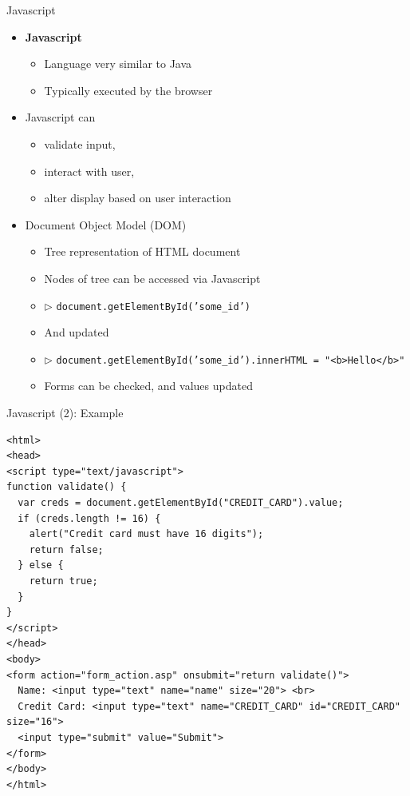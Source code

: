 \documentclass[aspectratio=169, xcolor=dvipsnames]{beamer}
\begin{document}
\begin{frame}{Javascript}
    \begin{itemize}
        \item \textbf{Javascript}
        \begin{itemize}
            \item Language very similar to Java
            \item Typically executed by the browser
        \end{itemize}
        \item Javascript can
        \begin{itemize}
            \item validate input,
            \item interact with user,
            \item alter display based on user interaction
        \end{itemize}
        \item Document Object Model (DOM)
        \begin{itemize}
            \item Tree representation of HTML document
            \item Nodes of tree can be accessed via Javascript
            \item $\triangleright$ \texttt{document.getElementById('some\_id')}
            \item And updated
            \item $\triangleright$ \texttt{document.getElementById('some\_id').innerHTML = "<b>Hello</b>"}
            \item Forms can be checked, and values updated
        \end{itemize}
    \end{itemize}
\end{frame}

\begin{frame}[fragile]{Javascript (2): Example}
    \begin{verbatim}
<html>
<head>
<script type="text/javascript">
function validate() {
  var creds = document.getElementById("CREDIT_CARD").value;
  if (creds.length != 16) {
    alert("Credit card must have 16 digits");
    return false;
  } else {
    return true;
  }
}
</script>
</head>
<body>
<form action="form_action.asp" onsubmit="return validate()">
  Name: <input type="text" name="name" size="20"> <br>
  Credit Card: <input type="text" name="CREDIT_CARD" id="CREDIT_CARD" size="16">
  <input type="submit" value="Submit">
</form>
</body>
</html>
    \end{verbatim}
\end{frame}
\end{document}
